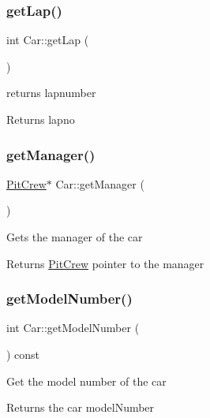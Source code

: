 \subsubsection{\texorpdfstring{get\+Lap()}{getLap()}}
{\footnotesize\ttfamily int Car\+::get\+Lap (\begin{DoxyParamCaption}{ }\end{DoxyParamCaption})\hspace{0.3cm}{\ttfamily [inline]}}

returns lapnumber \begin{DoxyReturn}{Returns}
lapno 
\end{DoxyReturn}
\mbox{\label{class_car_a225edc19422a1c521b4259abc363c046}} 
\subsubsection{\texorpdfstring{get\+Manager()}{getManager()}}
{\footnotesize\ttfamily \mbox{\hyperlink{class_pit_crew}{Pit\+Crew}}$\ast$ Car\+::get\+Manager (\begin{DoxyParamCaption}{ }\end{DoxyParamCaption})\hspace{0.3cm}{\ttfamily [inline]}}

Gets the manager of the car \begin{DoxyReturn}{Returns}
\mbox{\hyperlink{class_pit_crew}{Pit\+Crew}} pointer to the manager 
\end{DoxyReturn}
\mbox{\label{class_car_aea72486ce71ff0989725e8abda128e00}} 
\subsubsection{\texorpdfstring{get\+Model\+Number()}{getModelNumber()}}
{\footnotesize\ttfamily int Car\+::get\+Model\+Number (\begin{DoxyParamCaption}{ }\end{DoxyParamCaption}) const}

Get the model number of the car \begin{DoxyReturn}{Returns}
the car model\+Number 
\end{DoxyReturn}
\mbox{\label{class_car_a92753a8c68d5e0681dafd89db2e6e660}} 
